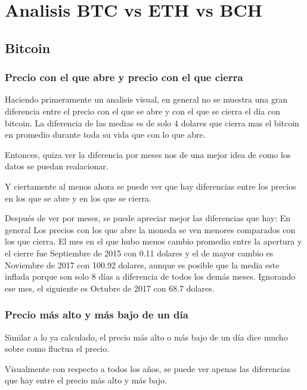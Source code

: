 \documentclass[12pt,letterpaper]{article}
\begin{document}
\section*{Analisis BTC vs ETH vs BCH}

    \subsection*{Bitcoin}

    \subsubsection*{Precio con el que abre y precio con el que cierra}

    Haciendo primeramente un analisis visual, en general no se muestra una gran diferencia entre el precio con el que se abre y con el que se cierra el día con bitcoin. La diferencia de las medias es de solo 4 dolares que cierra mas el bitcoin en promedio durante toda su vida que con lo que abre.
    
    
    Entonces, quiza ver la diferencia por meses nos de una mejor idea de como los datos se puedan realacionar.

    Y ciertamente al menos ahora se puede ver que hay diferencias entre los precios en los que se abre y en los que se cierra.

    Después de ver por meses, se puede apreciar mejor las diferencias que hay: En general Los precios con los que abre la moneda se ven menores comparados con los que cierra. El mes en el que hubo menos cambio promedio entre la apertura y el cierre fue Septiembre de 2015 con 0.11 dolares y el de mayor cambio es Noviembre de 2017 con 100.92 dolares, aunque es posible que la media este inflada porque son solo 8 días a diferencia de todos los demás meses. Ignorando ese mes, el siguiente es Octubre de 2017
    con 68.7 dolares.


    \subsubsection*{Precio más alto y más bajo de un día}

    Similar a lo ya calculado, el precio m\'as alto o m\'as bajo de un d\'ia dice mucho sobre como fluctua el precio.

    Visualmente con respecto a todos los a\~nos, se puede ver apenas las diferencias que hay entre el precio m\'as alto y m\'as bajo.
\end{document}
